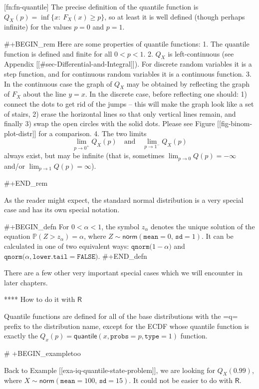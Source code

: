 [fn:fn-quantile] The precise definition of the quantile function is
\(Q_{X}(p)=\inf \{ x:\ F_{X}(x)\geq p \}\), so at least it is well
defined (though perhaps infinite) for the values \(p=0\) and \(p=1\).

#+BEGIN_rem
Here are some properties of quantile functions:
1. The quantile function is defined and finite for all \(0<p<1\).
2. \(Q_{X}\) is left-continuous (see Appendix
   [[#sec-Differential-and-Integral]]). For discrete random variables
   it is a step function, and for continuous random variables it is a
   continuous function.
3. In the continuous case the graph of \(Q_{X}\) may be obtained by
   reflecting the graph of \(F_{X}\) about the line \(y=x\). In the
   discrete case, before reflecting one should: 1) connect the dots to
   get rid of the jumps -- this will make the graph look like a set of
   stairs, 2) erase the horizontal lines so that only vertical lines
   remain, and finally 3) swap the open circles with the solid
   dots. Please see Figure [[fig-binom-plot-distr]] for a comparison.
4. The two limits \[ \lim_{p\to0^{+}}Q_{X}(p)\quad \mbox{and}\quad
   \lim_{p\to1^{-}}Q_{X}(p) \] always exist, but may be infinite (that
   is, sometimes \(\lim_{p\to0}Q(p)=-\infty\) and/or
   \(\lim_{p\to1}Q(p)=\infty\)).

#+END_rem

As the reader might expect, the standard normal distribution is a very
special case and has its own special notation.

#+BEGIN_defn
For \(0<\alpha<1\), the symbol \(z_{\alpha}\) denotes the unique
solution of the equation \( \mathbb{P} ( Z > z_{\alpha}) = \alpha\),
where \(Z \sim \mathsf{norm}(\mathtt{mean} = 0,\,\mathtt{sd} =
1)\). It can be calculated in one of two equivalent ways:
\(\mathtt{qnorm(} 1 - \alpha \mathtt{)} \) and \(\mathtt{qnorm(}
\alpha \mathtt{, lower.tail = FALSE)} \).
#+END_defn

There are a few other very important special cases which we will
encounter in later chapters.

**** How to do it with \(\mathsf{R}\)

Quantile functions are defined for all of the base distributions with
the =q= prefix to the distribution name, except for the ECDF whose
quantile function is exactly the \( Q_{x}(p) = \mathsf{quantile}(x,
\mathtt{probs} = p, \mathtt{type} = 1) \) function.

# +BEGIN_exampletoo

Back to Example [[exa-iq-quantile-state-problem]], we are looking for \(Q_{X}(0.99)\), where
\(X\sim\mathsf{norm}(\mathtt{mean}=100,\,\mathtt{sd}=15)\). It could
not be easier to do with \(\mathsf{R}\).

